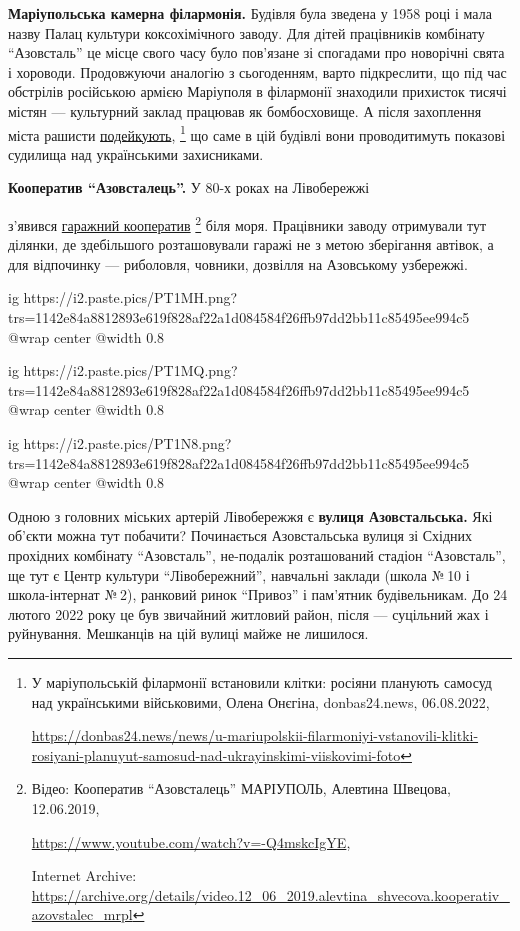 \textbf{\color{blue} Маріупольська камерна філармонія.} Будівля була зведена у 1958 році і мала назву
Палац культури коксохімічного заводу. Для дітей працівників комбінату
\enquote{Азовсталь} це місце свого часу було пов'язане зі спогадами про новорічні свята
і хороводи. Продовжуючи аналогію з сьогоденням, варто підкреслити, що під час
обстрілів російською армією Маріуполя в філармонії знаходили прихисток тисячі
містян — культурний заклад працював як бомбосховище. А після захоплення міста
рашисти \href{https://donbas24.news/news/u-mariupolskii-filarmoniyi-vstanovili-klitki-rosiyani-planuyut-samosud-nad-ukrayinskimi-viiskovimi-foto}{подейкують},%
\footnote{У маріупольській філармонії встановили клітки: росіяни планують самосуд над українськими військовими, Олена Онєгіна, donbas24.news, 06.08.2022, \par\url{https://donbas24.news/news/u-mariupolskii-filarmoniyi-vstanovili-klitki-rosiyani-planuyut-samosud-nad-ukrayinskimi-viiskovimi-foto}} що саме в цій будівлі вони проводитимуть показові судилища над українськими захисниками.

\textbf{\color{blue} Кооператив \enquote{Азовсталець}.} У 80-х роках на Лівобережжі\par\noindent з'явився 
\href{https://archive.org/details/video.12_06_2019.alevtina_shvecova.kooperativ_azovstalec_mrpl}{гаражний кооператив}%
\footnote{Відео: Кооператив \enquote{Азовсталець} МАРІУПОЛЬ, Алевтина Швецова, 12.06.2019, %
\par\url{https://www.youtube.com/watch?v=-Q4mskcIgYE}, \par%
Internet Archive: \url{https://archive.org/details/video.12_06_2019.alevtina_shvecova.kooperativ_azovstalec_mrpl}%
}
біля моря. Працівники заводу отримували тут ділянки, де здебільшого
розташовували гаражі не з метою зберігання автівок, а для відпочинку —
риболовля, човники, дозвілля на Азовському узбережжі.

\ifcmt
  ig https://i2.paste.pics/PT1MH.png?trs=1142e84a8812893e619f828af22a1d084584f26ffb97dd2bb11c85495ee994c5
  @wrap center
  @width 0.8
\fi

\ifcmt
  ig https://i2.paste.pics/PT1MQ.png?trs=1142e84a8812893e619f828af22a1d084584f26ffb97dd2bb11c85495ee994c5
  @wrap center
  @width 0.8
\fi

\ifcmt
  ig https://i2.paste.pics/PT1N8.png?trs=1142e84a8812893e619f828af22a1d084584f26ffb97dd2bb11c85495ee994c5
  @wrap center
  @width 0.8
\fi

Одною з головних міських артерій Лівобережжя є \textbf{\color{blue} вулиця Азовстальська.} Які
об'єкти можна тут побачити? Починається Азовстальська вулиця зі Східних
прохідних комбінату \enquote{Азовсталь}, не\hyp{}подалік розташований стадіон \enquote{Азовсталь}, ще
тут є Центр культури \enquote{Лівобережний}, навчальні заклади (школа № 10 і
школа-інтернат № 2), ранковий ринок \enquote{Привоз} і пам'ятник будівельникам. До 24
лютого 2022 року це був звичайний житловий район, після — суцільний жах і
руйнування. Мешканців на цій вулиці майже не лишилося.


